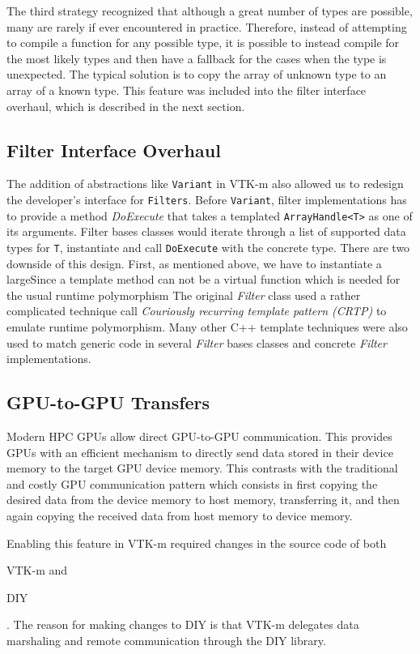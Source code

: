 The third strategy recognized that although a great number of types are possible, many are rarely if ever encountered in practice.
Therefore, instead of attempting to compile a function for any possible type, it is possible to instead compile for the most likely types and then have a fallback for the cases when the type is unexpected.
The typical solution is to copy the array of unknown type to an array of a known type.
This feature was included into the filter interface overhaul, which is described in the next section.

\subsection{Filter Interface Overhaul}


The addition of abstractions like \texttt{Variant} in VTK-m also allowed us to redesign the developer's interface for \texttt{Filters}. Before \texttt{Variant}, filter implementations has to provide a method \textit{DoExecute} that takes a templated \texttt{ArrayHandle<T>} as one of its arguments. Filter bases classes would iterate through a list of supported data types for \texttt{T}, instantiate and call \texttt{DoExecute} with the concrete type. There are two downside of this design. First, as mentioned above, we have to instantiate a largeSince a template method can not be a virtual function which is needed for the usual runtime polymorphism The original \textit{Filter} class used a rather complicated technique call \emph{Couriously recurring template pattern (CRTP)} to emulate runtime polymorphism. Many other C++ template techniques were also used to match generic code in several \textit{Filter} bases classes and concrete \textit{Filter} implementations.

\subsection{GPU-to-GPU Transfers}

Modern HPC GPUs allow direct GPU-to-GPU communication. This provides GPUs with an efficient mechanism to directly send data stored in their device memory to the target GPU device memory. This contrasts with the traditional and costly GPU communication pattern which consists in first copying the desired data from the device memory to host memory, transferring it, and then again copying the received data from host memory to device memory.

Enabling this feature in VTK-m required changes in the source code of both \begin{enumerate*} [label=\itshape(\alph*\upshape)]\item VTK-m and \item DIY\end{enumerate*}. The reason for making changes to DIY is that VTK-m delegates data marshaling and remote communication through the DIY library.

